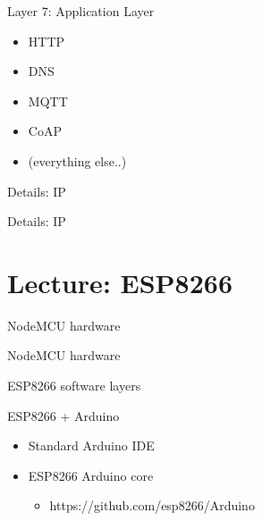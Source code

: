 \begin{frame}{Layer 7: Application Layer}
\protect\hypertarget{layer-7-application-layer}{}

\begin{itemize}
\tightlist
\item
  HTTP
\item
  DNS
\item
  MQTT
\item
  CoAP
\item
  (everything else..)
\end{itemize}

\end{frame}

\begin{frame}{Details: IP}
\protect\hypertarget{details-ip}{}


\end{frame}

\begin{frame}{Details: IP}
\protect\hypertarget{details-ip-1}{}

\end{frame}

\hypertarget{lecture-esp8266}{%
\section{Lecture: ESP8266}\label{lecture-esp8266}}

\begin{frame}{NodeMCU hardware}
\protect\hypertarget{nodemcu-hardware}{}

\end{frame}

\begin{frame}{NodeMCU hardware}
\protect\hypertarget{nodemcu-hardware-1}{}

\end{frame}

\begin{frame}{ESP8266 software layers}
\protect\hypertarget{esp8266-software-layers}{}

\end{frame}

\begin{frame}{ESP8266 + Arduino}
\protect\hypertarget{esp8266-arduino}{}

\begin{itemize}
\tightlist
\item
  Standard Arduino IDE
\item
  ESP8266 Arduino core

  \begin{itemize}
  \tightlist
  \item
    https://github.com/esp8266/Arduino
  \end{itemize}
\end{itemize}

\end{frame}

